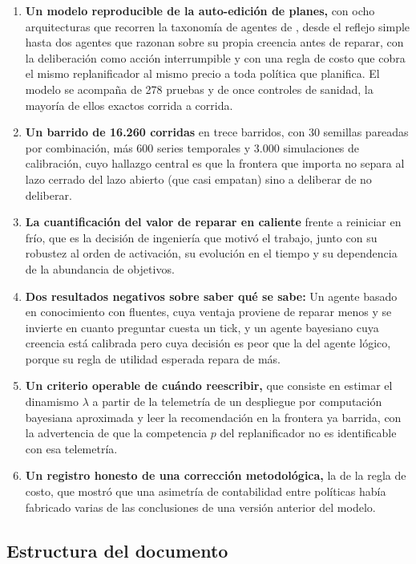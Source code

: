 \begin{enumerate}[leftmargin=1.6em, itemsep=0.3em]
  \item \textbf{Un modelo reproducible de la auto-edición de planes,} con ocho arquitecturas que recorren la taxonomía de agentes de \textcite{russellNorvig2020}, desde el reflejo simple hasta dos agentes que razonan sobre su propia creencia antes de reparar, con la deliberación como acción interrumpible y con una regla de costo que cobra el mismo replanificador al mismo precio a toda política que planifica. El modelo se acompaña de 278 pruebas y de once controles de sanidad, la mayoría de ellos exactos corrida a corrida.
  \item \textbf{Un barrido de 16.260 corridas} en trece barridos, con 30 semillas pareadas por combinación, más 600 series temporales y 3.000 simulaciones de calibración, cuyo hallazgo central es que la frontera que importa no separa al lazo cerrado del lazo abierto (que casi empatan) sino a deliberar de no deliberar.
  \item \textbf{La cuantificación del valor de reparar en caliente} frente a reiniciar en frío, que es la decisión de ingeniería que motivó el trabajo, junto con su robustez al orden de activación, su evolución en el tiempo y su dependencia de la abundancia de objetivos.
  \item \textbf{Dos resultados negativos sobre saber qué se sabe:} Un agente basado en conocimiento con fluentes, cuya ventaja proviene de reparar menos y se invierte en cuanto preguntar cuesta un tick, y un agente bayesiano cuya creencia está calibrada pero cuya decisión es peor que la del agente lógico, porque su regla de utilidad esperada repara de más.
  \item \textbf{Un criterio operable de cuándo reescribir,} que consiste en estimar el dinamismo $\lambda$ a partir de la telemetría de un despliegue por computación bayesiana aproximada y leer la recomendación en la frontera ya barrida, con la advertencia de que la competencia $p$ del replanificador no es identificable con esa telemetría.
  \item \textbf{Un registro honesto de una corrección metodológica,} la de la regla de costo, que mostró que una asimetría de contabilidad entre políticas había fabricado varias de las conclusiones de una versión anterior del modelo.
\end{enumerate}

\subsection{Estructura del documento}

